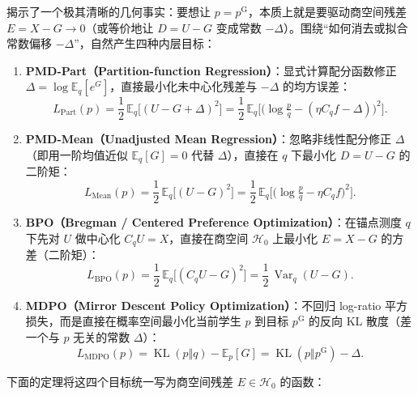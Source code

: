 \documentclass[lang=cn,scheme=chinese,openany]{../book/elegantbook}
\newcommand{\E}{\mathbb E}
\newcommand{\KL}{\operatorname{KL}}
\newcommand{\Var}{\operatorname{Var}}
\begin{document}
 揭示了一个极其清晰的几何事实：要想让 $p=p^{\mathrm G}$，本质上就是要驱动商空间残差 $E=X-G\to 0$（或等价地让 $D=U-G$ 变成常数 $-\Delta$）。围绕“如何消去或拟合常数偏移 $-\Delta$”，自然产生四种内层目标：
\begin{enumerate}
 \item \textbf{PMD-Part（Partition-function Regression）}：显式计算配分函数修正 $\Delta=\log\E_q[e^G]$，直接最小化未中心化残差与 $-\Delta$ 的均方误差：
 \begin{equation}
  L_{\mathrm{Part}}(p)=\frac12\,\E_q\bigl[(U-G+\Delta)^2\bigr]
  =\frac12\,\E_q\bigl[\bigl(\log\tfrac{p}{q}-(\eta C_q f-\Delta)\bigr)^2\bigr].
  \label{eq:loss-part}
 \end{equation}
 \item \textbf{PMD-Mean（Unadjusted Mean Regression）}：忽略非线性配分修正 $\Delta$（即用一阶均值近似 $\E_q[G]=0$ 代替 $\Delta$），直接在 $q$ 下最小化 $D=U-G$ 的二阶矩：
 \begin{equation}
  L_{\mathrm{Mean}}(p)=\frac12\,\E_q\bigl[(U-G)^2\bigr]
  =\frac12\,\E_q\bigl[\bigl(\log\tfrac{p}{q}-\eta C_q f\bigr)^2\bigr].
  \label{eq:loss-mean}
 \end{equation}
 \item \textbf{BPO（Bregman / Centered Preference Optimization）}：在锚点测度 $q$ 下先对 $U$ 做中心化 $C_q U=X$，直接在商空间 $\mathcal H_0$ 上最小化 $E=X-G$ 的方差（二阶矩）：
 \begin{equation}
  L_{\mathrm{BPO}}(p)=\frac12\,\E_q\bigl[(C_q U-G)^2\bigr]
  =\frac12\,\Var_q(U-G).
  \label{eq:loss-bpo}
 \end{equation}
 \item \textbf{MDPO（Mirror Descent Policy Optimization）}：不回归 log-ratio 平方损失，而是直接在概率空间最小化当前学生 $p$ 到目标 $p^{\mathrm G}$ 的反向 KL 散度（差一个与 $p$ 无关的常数 $\Delta$）：
 \begin{equation}
  L_{\mathrm{MDPO}}(p)=\KL(p\Vert q)-\E_p[G]
  =\KL(p\Vert p^{\mathrm G})-\Delta.
  \label{eq:loss-mdpo}
 \end{equation}
\end{enumerate}

下面的定理将这四个目标统一写为商空间残差 $E\in\mathcal H_0$ 的函数：
\end{document}
